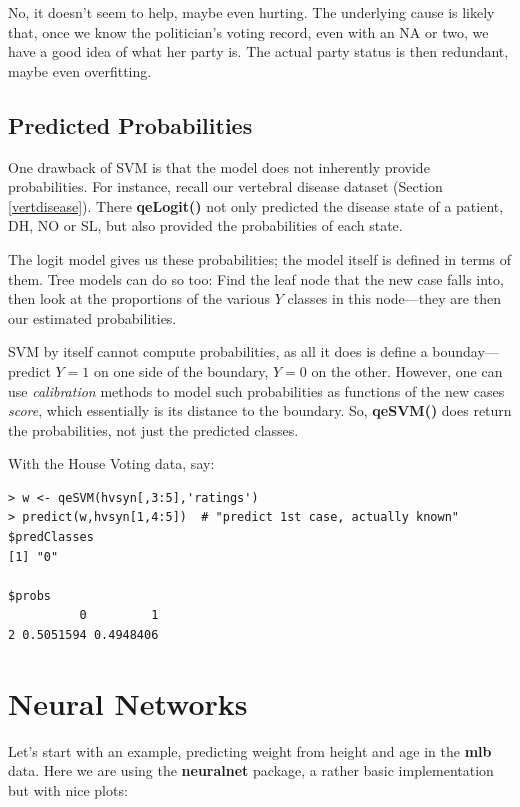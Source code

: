 No, it doesn't seem to help, maybe even hurting.  The underlying cause is
likely that, once we know the politician's voting record, even with an
NA or two, we have a good idea of what her party is.  The actual party
status is then redundant, maybe even overfitting.

\subsection{Predicted Probabilities}

One drawback of SVM is that the model does not inherently provide
probabilities.  For instance, recall our vertebral disease dataset
(Section \ref{vertdisease}).  There \textbf{qeLogit()} not only
predicted the disease state of a patient, DH, NO or SL, but also
provided the probabilities of each state.  

The logit model gives us these probabilities; the model itself is
defined in terms of them.  Tree models can do so too:  Find the leaf
node that the new case falls into, then look at the proportions of the
various $Y$ classes in this node---they are then our estimated
probabilities.

SVM by itself cannot compute probabilities, as all it does is define a
bounday---predict $Y = 1$ on one side of the boundary, $Y = 0$ on the
other.  However, one can use \textit{calibration} methods to model such
probabilities as functions of the new cases \textit{score}, which
essentially is its distance to the boundary.  So, \textbf{qeSVM()} does
return the probabilities, not just the predicted classes.

With the House Voting data, say:

\begin{lstlisting}
> w <- qeSVM(hvsyn[,3:5],'ratings')
> predict(w,hvsyn[1,4:5])  # "predict 1st case, actually known"
$predClasses
[1] "0"

$probs
          0         1
2 0.5051594 0.4948406

\end{lstlisting}

\section{Neural Networks}

Let's start with an example, predicting weight from height and age in
the \textbf{mlb} data.  Here we are using the \textbf{neuralnet}
package, a rather basic implementation but with nice plots:

